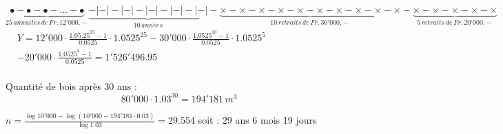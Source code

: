 \begin{solution}
$\underbrace{\bullet -\bullet -\bullet -...-\bullet }_{25\,annuit\acute{e}s\,de\,Fr.\,12'000.-}\underbrace{-|-|-|-|-|-|-|-|-|-|}_{10\,ann\acute{e}es}-\underbrace{\times -\times -\times -\times -\times -\times -\times -\times -\times -\times }_{10\,retraits\,de\,Fr.\,30'000.-}-\underbrace{\times -\times -\times -\times -\times }_{5\,retraits\,de\,Fr.\,20'000.-}$
	$\begin{array}{ll}
  & Y=12'000\cdot \frac{{{1.05.25}^{25}}-1}{0.0525}\cdot {{1.0525}^{25}}-30'000\cdot \frac{{{1.0525}^{10}}-1}{0.0525}\cdot {{1.0525}^{5}} \\ 
 & -20'000\cdot \frac{{{1.0525}^{5}}-1}{0.0525}=1'526'496.95 \\ 
\end{array}$
\end{solution}

\begin{solution}
Quantité de bois après 30 ans : \[80'000\cdot {{1.03}^{30}}=194'181\,{{m}^{3}}\]

		$n=\frac{\log 10'000-\log \left( 10'000-194'181\cdot 0.03 \right)}{\log 1.03}=29.554$  soit : 29 ans 6 mois 19 jours
\end{solution}

